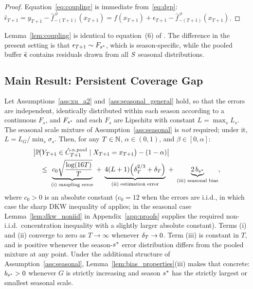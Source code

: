 \begin{proof}
  Equation~\eqref{eq:coupling} is immediate from~\eqref{eq:dgp}:
  $\hat{\epsilon}_{T+1} = y_{T+1} - \hat{f}_{-(T+1)}^{\,\phi}(x_{T+1})
  = f(x_{T+1}) + \epsilon_{T+1} - \hat{f}_{-(T+1)}^{\,\phi}(x_{T+1})$.
\end{proof}

Lemma~\ref{lem:coupling} is identical to equation~(6) of
\citet{xu2023conformal}.  The difference in the present setting is
that $\epsilon_{T+1} \sim F_{s^*}$, which is season-specific,
while the pooled buffer $\hat{\boldsymbol\epsilon}$ contains
residuals drawn from all $S$ seasonal distributions.

\subsection{Main Result: Persistent Coverage Gap}
\label{sec:pooled_gap:main}

\begin{proposition}
\label{prop:pooled_gap}
Let Assumptions~\ref{ass:xu_a2} and~\ref{ass:seasonal_general} hold,
so that the errors are independent, identically distributed within
each season according to a continuous $F_s$, and $F_{s^*}$ and each
$F_s$ are Lipschitz with constant $L = \max_s L_s$.  The seasonal
scale mixture of Assumption~\ref{ass:seasonal} is \emph{not} required;
under it, $L = L_G/\min_s \sigma_s$.
Then, for any $T \in \mathbb{N}$, $\alpha \in (0,1)$, and $\beta \in [0,\alpha]$:
%
\begin{align}
  \label{eq:pooled_gap}
  &\bigl|
    \mathbb{P}\!\bigl(Y_{T+1} \in \hat{C}_{T+1}^{\,\alpha,\textup{pool}}
               \mid X_{T+1} = x_{T+1}\bigr) - (1-\alpha)
  \bigr| \notag\\
  &\quad\leq\;
  \underbrace{c_0\sqrt{\frac{\log(16T)}{T}}}_{\text{(i) sampling error}}
  \;+\;
  \underbrace{4(L+1)\!\left(\delta_T^{2/3} + \delta_T\right)}_{\text{(ii) estimation error}}
  \;+\;
  \underbrace{2\,b_{s^*}}_{\text{(iii) seasonal bias}},
\end{align}
%
where $c_0 > 0$ is an absolute constant ($c_0 = 12$ when the errors
are i.i.d., in which case the sharp DKW inequality of
\citealt{massart1990tight} applies; in the seasonal case
Lemma~\ref{lem:dkw_noniid} in Appendix~\ref{app:proofs} supplies the
required non-i.i.d.\ concentration inequality with a slightly larger
absolute constant).
Terms \textup{(i)} and \textup{(ii)} converge to zero as $T\to\infty$
whenever $\delta_T \to 0$.  Term \textup{(iii)} is constant in $T$, and
is positive whenever the season-$s^*$ error distribution differs
from the pooled mixture at any point.  Under the additional structure
of Assumption~\ref{ass:seasonal},
Lemma~\ref{lem:bias_properties}(iii) makes that concrete:
$b_{s^*} > 0$ whenever $G$ is strictly increasing and season
$s^*$ has the strictly largest or smallest seasonal scale.
\end{proposition}

